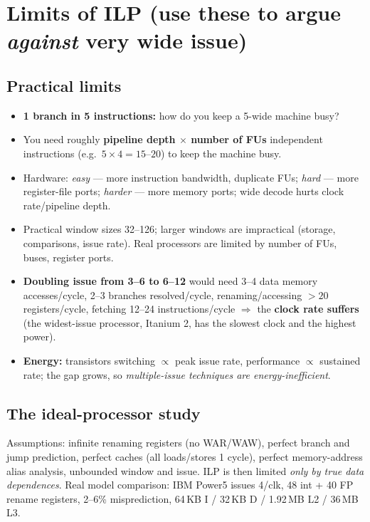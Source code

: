 \section{Limits of ILP (use these to argue \emph{against} very wide issue)}
\subsection{Practical limits}
\begin{itemize}
\item \textbf{1 branch in 5 instructions:} how do you keep a 5-wide machine busy?
\item You need roughly \textbf{pipeline depth $\times$ number of FUs} independent instructions (e.g.\ $5\times4=15$--$20$) to keep the machine busy.
\item Hardware: \emph{easy} --- more instruction bandwidth, duplicate FUs; \emph{hard} --- more register-file ports; \emph{harder} --- more memory ports; wide decode hurts clock rate/pipeline depth.
\item Practical window sizes 32--126; larger windows are impractical (storage, comparisons, issue rate). Real processors are limited by number of FUs, buses, register ports.
\item \textbf{Doubling issue from 3--6 to 6--12} would need 3--4 data memory accesses/cycle, 2--3 branches resolved/cycle, renaming/accessing $>20$ registers/cycle, fetching 12--24 instructions/cycle $\Rightarrow$ the \textbf{clock rate suffers} (the widest-issue processor, Itanium 2, has the slowest clock and the highest power).
\item \textbf{Energy:} transistors switching $\propto$ peak issue rate, performance $\propto$ sustained rate; the gap grows, so \emph{multiple-issue techniques are energy-inefficient}.
\end{itemize}

\subsection{The ideal-processor study}
Assumptions: infinite renaming registers (no WAR/WAW), perfect branch and jump prediction, perfect caches (all loads/stores 1 cycle), perfect memory-address alias analysis, unbounded window and issue. ILP is then limited \emph{only by true data dependences}. Real model comparison: IBM Power5 issues 4/clk, 48 int + 40 FP rename registers, 2--6\% misprediction, 64\,KB I / 32\,KB D / 1.92\,MB L2 / 36\,MB L3.

